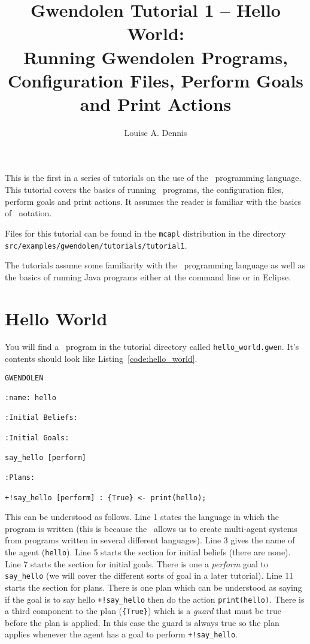 \documentclass[a4]{article}
\author{Louise A. Dennis}
\title{Gwendolen Tutorial 1 -- Hello World: \\
Running Gwendolen Programs, Configuration Files, Perform Goals and Print Actions}
\begin{document}
\maketitle
This is the first in a series of tutorials on the use of the \gwendolen\ programming language.  This tutorial covers the basics of running \gwendolen\ programs, the configuration files, perform goals and print actions.  It assumes the reader is familiar with the basics of \prolog\ notation.

Files for this tutorial can be found in the \texttt{mcapl} distribution in the directory \texttt{src/examples/gwendolen/tutorials/tutorial1}.

The tutorials assume some familiarity with the \prolog\ programming language as well as the basics of running Java programs either at the command line or in Eclipse.

\section{Hello World}

You will find a \gwendolen\ program in the tutorial directory called \texttt{hello\_world.gwen}.  It's contents should look like Listing~\ref{code:hello_world}.
\begin{lstlisting}[float,caption=Hello World,basicstyle=\sffamily,style=easslisting,language=Gwendolen,label=code:hello_world]
GWENDOLEN

:name: hello

:Initial Beliefs:

:Initial Goals:

say_hello [perform]

:Plans:

+!say_hello [perform] : {True} <- print(hello);
\end{lstlisting}

This can be understood as follows.  Line 1 states the language in which the program is written (this is because the \ail\ allows us to create multi-agent systems from programs written in several different languages).  Line 3 gives the name of the agent (\lstinline{hello}).  Line 5 starts the section for initial beliefs (there are none).  Line 7 starts the section for initial goals.  There is one a \emph{perform} goal to \lstinline{say_hello} (we will cover the different sorts of goal in a later tutorial).  Line 11 starts the section for plans.  There is one plan which can be understood as saying if the goal is to say hello \lstinline{+!say_hello} then do the action \lstinline{print(hello)}.  There is a third component to the plan (\lstinline+{True}+) which is a \emph{guard} that must be true before the plan is applied.  In this case the guard is always true so the plan applies whenever the agent has a goal to perform \lstinline{+!say_hello}.
\end{document}
